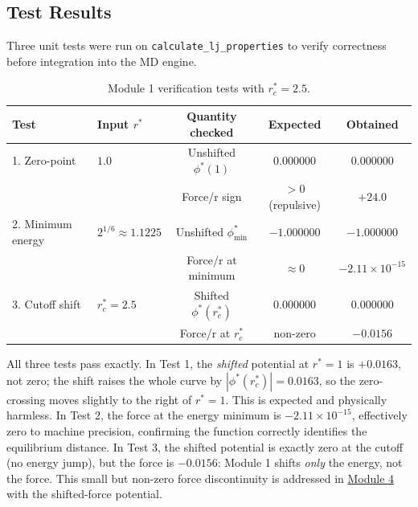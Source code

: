 \subsection{Test Results}

Three unit tests were run on \texttt{calculate\_lj\_properties} to verify correctness before integration into the MD engine.

\begin{table}[H]
    \centering
    \caption{Module 1 verification tests with $r_c^* = 2.5$.}
    \label{tab:m1_tests}
    \begin{tabular}{llccc}
        \toprule
        \textbf{Test} & \textbf{Input $r^*$} & \textbf{Quantity checked} & \textbf{Expected} & \textbf{Obtained} \\
        \midrule
        1. Zero-point    & $1.0$         & Unshifted $\phi^*(1)$         & $0.000000$   & $0.000000$ \\
                         &               & Force/r sign                  & $> 0$ (repulsive) & $+24.0$ \\[4pt]
        2. Minimum energy & $2^{1/6} \approx 1.1225$ & Unshifted $\phi^*_\text{min}$ & $-1.000000$ & $-1.000000$ \\
                         &               & Force/r at minimum            & $\approx 0$  & $-2.11\times10^{-15}$ \\[4pt]
        3. Cutoff shift  & $r_c^* = 2.5$ & Shifted $\phi^*(r_c^*)$       & $0.000000$   & $0.000000$ \\
                         &               & Force/r at $r_c^*$            & non-zero     & $-0.0156$ \\
        \bottomrule
    \end{tabular}
\end{table}

All three tests pass exactly. In Test 1, the \emph{shifted} potential at $r^*=1$ is $+0.0163$, not zero; the shift raises the whole curve by $|\phi^*(r_c^*)| = 0.0163$, so the zero-crossing moves slightly to the right of $r^* = 1$. This is expected and physically harmless. In Test 2, the force at the energy minimum is $-2.11\times10^{-15}$, effectively zero to machine precision, confirming the function correctly identifies the equilibrium distance. In Test 3, the shifted potential is exactly zero at the cutoff (no energy jump), but the force is $-0.0156$: Module 1 shifts \emph{only} the energy, not the force. This small but non-zero force discontinuity is addressed in \hyperref[sec:module4]{Module 4} with the shifted-force potential.
